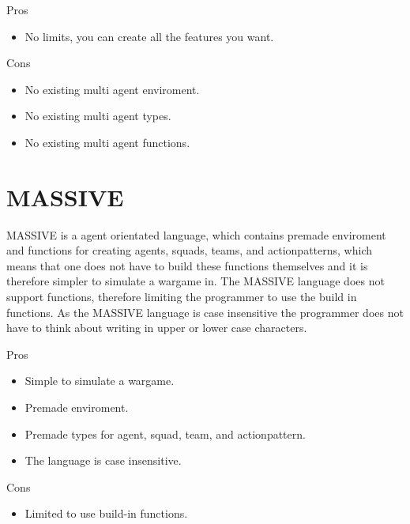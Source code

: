 Pros
\begin{itemize}
	\item No limits, you can create all the features you want.\\
\end{itemize}

Cons
\begin{itemize}
	\item No existing multi agent enviroment.
	\item No existing multi agent types.
	\item No existing multi agent functions.
\end{itemize}

\section{MASSIVE}
MASSIVE is a agent orientated language, which contains premade enviroment and functions for creating agents, squads, teams, and actionpatterns, which means that one does not have to build these functions themselves and it is therefore simpler to simulate a wargame in. The MASSIVE language does not support functions, therefore limiting the programmer to use the build in functions. As the MASSIVE language is case insensitive the programmer does not have to think about writing in upper or lower case characters.


Pros
\begin{itemize}
	\item Simple to simulate a wargame.
  \item	Premade enviroment.
	\item Premade types for agent, squad, team, and actionpattern.
	\item The language is case insensitive.
\end{itemize}

Cons
\begin{itemize}
	\item Limited to use build-in functions.
\end{itemize}

